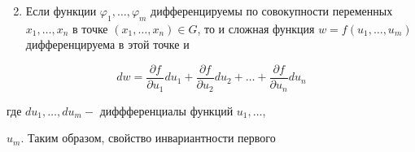 \documentclass[10pt]{article}
\begin{document}
\begin{enumerate}

  \setcounter{enumi}{1}

  \item Если функции $\varphi_{1}, \ldots, \varphi_{m}$ дифференцируемы по совокупности переменных $x_{1}, \ldots, x_{n}$ в точке $\left(x_{1}, \ldots, x_{n}\right) \in G$, то и сложная функция $w=f\left(u_{1}, \ldots, u_{m}\right)$ дифференцируема в этой точке и

\end{enumerate}



\[

d w=\frac{\partial f}{\partial u_{1}} d u_{1}+\frac{\partial f}{\partial u_{2}} d u_{2}+\ldots+\frac{\partial f}{\partial u_{n}} d u_{n}

\]



где $d u_{1}, \ldots, d u_{m}-$ диффференциалы функций $u_{1}, \ldots$,

$u_{m}$. Таким образом, свойство инвариантности первого
\end{document}
